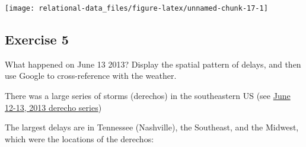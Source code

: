 \documentclass[]{book}
\newenvironment{Shaded}{\begin{snugshade}}{\end{snugshade}}
\newcommand{\DataTypeTok}[1]{\textcolor[rgb]{0.13,0.29,0.53}{#1}}
\newcommand{\KeywordTok}[1]{\textcolor[rgb]{0.13,0.29,0.53}{\textbf{#1}}}
\newcommand{\NormalTok}[1]{#1}
\newcommand{\OperatorTok}[1]{\textcolor[rgb]{0.81,0.36,0.00}{\textbf{#1}}}
\newcommand{\OtherTok}[1]{\textcolor[rgb]{0.56,0.35,0.01}{#1}}
\newcommand{\StringTok}[1]{\textcolor[rgb]{0.31,0.60,0.02}{#1}}
\theoremstyle{definition}
\theoremstyle{definition}
\theoremstyle{definition}
\theoremstyle{remark}
\begin{document}
\begin{Shaded}
\end{Shaded}

\begin{center}\texttt{[image: relational-data\_files/figure-latex/unnamed-chunk-17-1]} \end{center}

\hypertarget{exercise-5-7}{%
\subsection{Exercise 5}\label{exercise-5-7}}

What happened on June 13 2013? Display the spatial pattern of delays,
and then use Google to cross-reference with the weather.

There was a large series of storms (derechos) in the southeastern US
(see
\href{https://en.wikipedia.org/wiki/June_12\%E2\%80\%9313,_2013_derecho_series}{June
12-13, 2013 derecho series})

The largest delays are in Tennessee (Nashville), the Southeast, and the
Midwest, which were the locations of the derechos:
\end{document}
